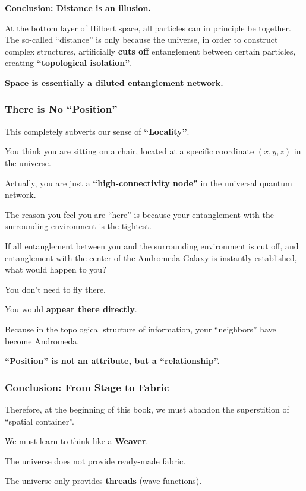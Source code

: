 \textbf{Conclusion: Distance is an illusion.}

At the bottom layer of Hilbert space, all particles can in principle be together. The so-called ``distance'' is only because the universe, in order to construct complex structures, artificially \textbf{cuts off} entanglement between certain particles, creating \textbf{``topological isolation''}.

\textbf{Space is essentially a diluted entanglement network.}

\subsubsection{There is No ``Position''}

This completely subverts our sense of \textbf{``Locality''}.

You think you are sitting on a chair, located at a specific coordinate $(x, y, z)$ in the universe.

Actually, you are just a \textbf{``high-connectivity node''} in the universal quantum network.

The reason you feel you are ``here'' is because your entanglement with the surrounding environment is the tightest.

If all entanglement between you and the surrounding environment is cut off, and entanglement with the center of the Andromeda Galaxy is instantly established, what would happen to you?

You don't need to fly there.

You would \textbf{appear there directly}.

Because in the topological structure of information, your ``neighbors'' have become Andromeda.

\textbf{``Position'' is not an attribute, but a ``relationship''.}

\subsubsection{Conclusion: From Stage to Fabric}

Therefore, at the beginning of this book, we must abandon the superstition of ``spatial container''.

We must learn to think like a \textbf{Weaver}.

The universe does not provide ready-made fabric.

The universe only provides \textbf{threads} (wave functions).

